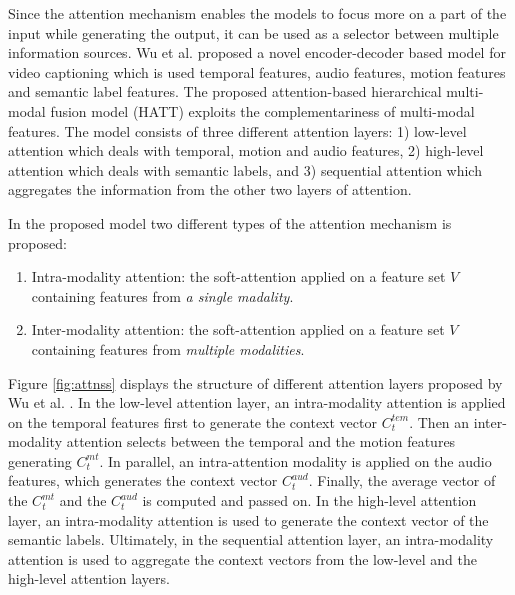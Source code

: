 \documentclass[preprint, 10pt]{elsarticle}
\begin{document}
		Since the attention mechanism enables the models to focus more on a part of the input while generating the output, it can be used as a selector between multiple information sources. Wu et al. \cite{wu2018hierarchical} proposed a novel encoder-decoder based model for video captioning which is used temporal features, audio features, motion features and semantic label features. The proposed attention-based hierarchical multi-modal fusion model (HATT) exploits the complementariness of multi-modal features. The model consists of three different attention layers: 1) low-level attention which deals with temporal, motion and audio features, 2) high-level attention which deals with semantic labels, and 3) sequential attention which aggregates the information from the other two layers of attention. 
		
		In the proposed model two different types of the attention mechanism is proposed:
		\begin{enumerate}
			\item Intra-modality attention: the soft-attention applied on a feature set $V$ containing features from \textit{a single madality}.
			
			\item Inter-modality attention: the soft-attention applied on a feature set $V$ containing features from \textit{multiple modalities}.
		\end{enumerate}
Figure \ref{fig:attnss} displays the structure of different attention layers proposed by Wu et al. \cite{wu2018hierarchical}. In the low-level attention layer, an intra-modality attention is applied on the temporal features first to generate the context vector $C_t^{tem}$. Then an inter-modality attention selects between the temporal and the motion features generating $C_t^{mt}$. In parallel, an intra-attention modality is applied on the audio features, which generates the context vector $C_t^{aud}$. Finally, the average vector of the $C_t^{mt}$ and the $C_t^{aud}$ is computed and passed on. In the high-level attention layer, an intra-modality attention is used to generate the context vector of the semantic labels. Ultimately, in the sequential attention layer, an intra-modality attention is used to aggregate the context vectors from the low-level and the high-level attention layers.
\end{document}
